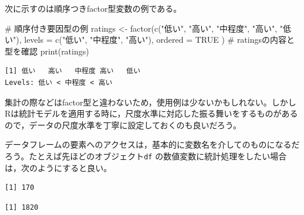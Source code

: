 \documentclass[
  a4paper,
]{ltjsbook}
\newenvironment{Shaded}{\begin{snugshade}}{\end{snugshade}}
\newcommand{\AttributeTok}[1]{\textcolor[rgb]{0.40,0.45,0.13}{#1}}
\newcommand{\CommentTok}[1]{\textcolor[rgb]{0.37,0.37,0.37}{#1}}
\newcommand{\ConstantTok}[1]{\textcolor[rgb]{0.56,0.35,0.01}{#1}}
\newcommand{\FunctionTok}[1]{\textcolor[rgb]{0.28,0.35,0.67}{#1}}
\newcommand{\NormalTok}[1]{\textcolor[rgb]{0.00,0.23,0.31}{#1}}
\newcommand{\OtherTok}[1]{\textcolor[rgb]{0.00,0.23,0.31}{#1}}
\newcommand{\SpecialCharTok}[1]{\textcolor[rgb]{0.37,0.37,0.37}{#1}}
\newcommand{\StringTok}[1]{\textcolor[rgb]{0.13,0.47,0.30}{#1}}
\begin{document}
次に示すのは順序つきfactor型変数の例である。

\begin{Shaded}
\begin{Highlighting}[]
\CommentTok{\# 順序付き要因型の例}
\NormalTok{ratings }\OtherTok{\textless{}{-}} \FunctionTok{factor}\NormalTok{(}\FunctionTok{c}\NormalTok{(}\StringTok{"低い"}\NormalTok{, }\StringTok{"高い"}\NormalTok{, }\StringTok{"中程度"}\NormalTok{, }\StringTok{"高い"}\NormalTok{, }\StringTok{"低い"}\NormalTok{),}
  \AttributeTok{levels =} \FunctionTok{c}\NormalTok{(}\StringTok{"低い"}\NormalTok{, }\StringTok{"中程度"}\NormalTok{, }\StringTok{"高い"}\NormalTok{),}
  \AttributeTok{ordered =} \ConstantTok{TRUE}
\NormalTok{)}
\CommentTok{\# ratingsの内容と型を確認}
\FunctionTok{print}\NormalTok{(ratings)}
\end{Highlighting}
\end{Shaded}

\begin{verbatim}
[1] 低い   高い   中程度 高い   低い  
Levels: 低い < 中程度 < 高い
\end{verbatim}

集計の際などはfactor型と違わないため，使用例は少ないかもしれない。しかしRは統計モデルを適用する時に，尺度水準に対応した振る舞いをするものがあるので，データの尺度水準を丁寧に設定しておくのも良いだろう。

データフレームの要素へのアクセスは，基本的に変数名を介してのものになるだろう。たとえば先ほどのオブジェクト\texttt{df}
の数値変数に統計処理をしたい場合は，次のようにすると良い。

\begin{Shaded}
\end{Shaded}

\begin{verbatim}
[1] 170
\end{verbatim}

\begin{Shaded}
\end{Shaded}

\begin{verbatim}
[1] 1820
\end{verbatim}
\end{document}
